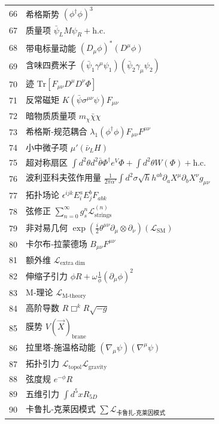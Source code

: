 \documentclass[11pt,a4paper]{article}
\begin{document}
\begin{longtable}{r l}
		66 & 希格斯势 \((\phi^\dagger\phi)^3\) \\
		67 & 质量项 \(\bar{\psi}_L M \psi_R + \text{h.c.}\) \\
		68 & 带电标量动能 \((D_\mu\phi)^*(D^\mu\phi)\) \\
		69 & 含味四费米子 \((\bar{\psi}_1\gamma^\mu\psi_1)(\bar{\psi}_2\gamma_\mu\psi_2)\) \\
		70 & 迹 \(\mathrm{Tr}[F_{\mu\nu}D^\mu D^\nu\Phi]\) \\
		71 & 反常磁矩 \(K(\bar{\psi}\sigma^{\mu\nu}\psi)F_{\mu\nu}\) \\
		72 & 暗物质质量项 \(m_\chi\bar{\chi}\chi\) \\
		73 & 希格斯‑规范耦合 \(\lambda_1(\phi^\dagger\phi)F_{\mu\nu}F^{\mu\nu}\) \\
		74 & 小中微子项 \(\mu'(\bar{\nu}_L H)\) \\
		75 & 超对称扇区 \(\int d^2\theta d^2\bar{\theta}\Phi^\dagger e^V\Phi + \int d^2\theta W(\Phi) + \text{h.c.}\) \\
		76 & 波利亚科夫弦作用量 \(\frac{1}{2\pi\alpha'}\int d^2\sigma\sqrt{h}h^{ab}\partial_a X^\mu\partial_b X^\nu g_{\mu\nu}\) \\
		77 & 拓扑场论 \(\epsilon^{ijk}E_i^a E_j^b F_{ab k}\) \\
		78 & 弦修正 \(\sum_{n=0}^\infty g_s^n \mathcal{L}^{(n)}_{\text{strings}}\) \\
		79 & 非对易几何 \(\exp\left(\frac{i}{2}\theta^{\mu\nu}\partial_\mu\otimes\partial_\nu\right)(\mathcal{L}_{\text{SM}})\) \\
		80 & 卡尔布‑拉蒙德场 \(B_{\mu\nu}F^{\mu\nu}\) \\
		81 & 额外维 \(\mathcal{L}_{\text{extra dim}}\) \\
		82 & 伸缩子引力 \(\phi R + \omega\frac{1}{\phi}(\partial_\mu\phi)^2\) \\
		83 & M‑理论 \(\mathcal{L}_{\text{M‑theory}}\) \\
		84 & 高阶导数 \(R\Box^k R\sqrt{-g}\) \\
		85 & 膜势 \(V(\vec{X})_{\text{brane}}\) \\
		86 & 拉里塔‑施温格动能 \((\nabla_\mu\psi)(\nabla^\mu\psi)\) \\
		87 & 拓扑引力 \(\mathcal{L}_{\text{topol}}\mathcal{L}_{\text{gravity}}\) \\
		88 & 弦度规 \(e^{-\phi}R\) \\
		89 & 五维引力 \(\int d^5x R_{5D}\) \\
		90 & 卡鲁扎‑克莱因模式 \(\sum\mathcal{L}_{\text{卡鲁扎‑克莱因模式}}\) \\

\end{longtable}
\end{document}
